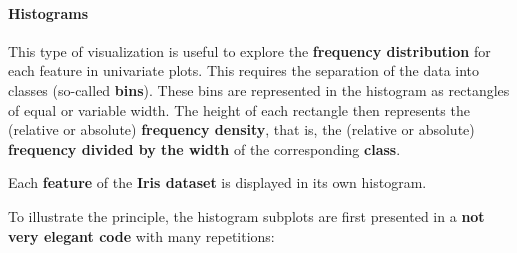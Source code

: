 \documentclass [oneside,10pt,a4paper,ngerman,BCOR10mm,headsepline,parindent,final]{scrartcl}
\begin{document}
    \hypertarget{histograms}{%
\paragraph{Histograms}\label{histograms}}

This type of visualization is useful to explore the \textbf{frequency
distribution} for each feature in univariate plots. This requires the
separation of the data into classes (so-called \textbf{bins}). These
bins are represented in the histogram as rectangles of equal or variable
width. The height of each rectangle then represents the (relative or
absolute) \textbf{frequency density}, that is, the (relative or
absolute) \textbf{frequency divided by the width} of the corresponding
\textbf{class}.

Each \textbf{feature} of the \textbf{Iris dataset} is displayed in its
own histogram.

To illustrate the principle, the histogram subplots are first presented
in a \textbf{not very elegant code} with many repetitions:
\end{document}
